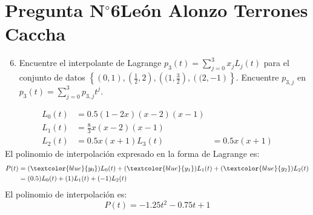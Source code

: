 \section{Pregunta N$^{\circ}$6\qquad León Alonzo Terrones Caccha}




\begin{frame}
	\begin{enumerate}\setcounter{enumi}{5}
		\item

		      Encuentre el interpolante de Lagrange
		      \begin{math}
			      p_{3}\left(t\right)=
			      \sum\limits_{j=0}^{3}
			      x_{j}
			      L_{j}\left(t\right)
		      \end{math}
		      para el conjunto de datos
		      \begin{math}
			      \left\{
			      \left(0,1\right),
			      \left(\frac{1}{2},2\right),
			      \left((1,\frac{3}{2}\right),
                    \left((2,-1\right)
			      \right\}
		      \end{math}.
		      Encuentre $p_{3,j}$ en
		      \begin{math}
			      p_{3}\left(t\right)=
			      \sum\limits_{j=0}^{3}
			      p_{3,j}t^{j}
		      \end{math}.
	\end{enumerate}

	\begin{solution}
        \begin{align*}
            L_{0}(t)&=0.5 (1-2x)(x-2)(x-1)\\
            L_{1}(t)&=\frac{8}{3} x(x-2)(x-1)\\
            L_{2}(t)&=0.5 x(x+1)
            L_{3}(t)&=0.5 x(x+1)
        \end{align*}
        El polinomio de interpolación expresado en la forma de Lagrange es:
        \begin{align*}
            P(t)&=(\textcolor{blue}{y_0})L_{0}(t)+(\textcolor{blue}{y_1})L_{1}(t)+(\textcolor{blue}{y_2})L_{2}(t)\\
            &=(0.5)L_{0}(t)+(1)L_{1}(t)+(-1)L_{2}(t)
        \end{align*}
        El polinomio de interpolación es:
		$$P(t)=-1.25t^{2}-0.75t+1$$
  \end{solution}
\end{frame}
